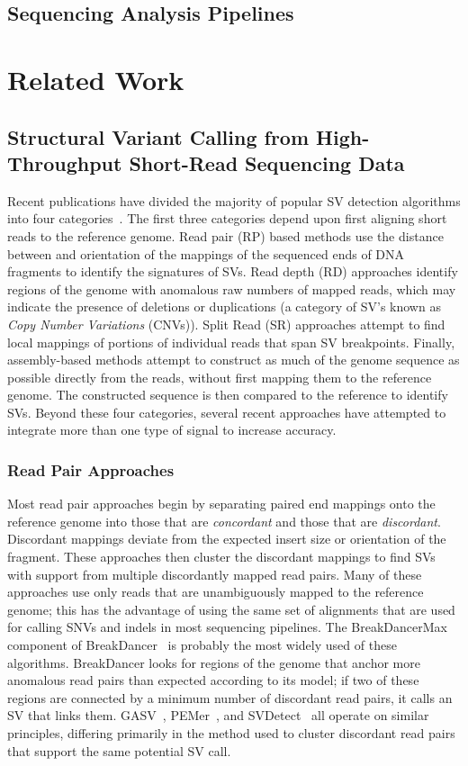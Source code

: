 \documentclass [11pt] {report}
\begin{document}
\section{Sequencing Analysis Pipelines}

% 
\chapter{Related Work}

\section{Structural Variant Calling from High-Throughput Short-Read Sequencing Data}

Recent publications have divided the majority of popular SV detection algorithms into four categories~\cite{Alkan:2011p547}. The first three categories depend upon first aligning short reads to the reference genome. Read pair (RP) based methods use the distance between and orientation of the mappings of the sequenced ends of DNA fragments to identify the signatures of SVs. Read depth (RD) approaches identify regions of the genome with anomalous raw numbers of mapped reads, which may indicate the presence of deletions or duplications (a category of SV's known as \emph{Copy Number Variations} (CNVs)). Split Read (SR) approaches attempt to find local mappings of portions of individual reads that span SV breakpoints. Finally, assembly-based methods attempt to construct as much of the genome sequence as possible directly from the reads, without first mapping them to the reference genome. The constructed sequence is then compared to the reference to identify SVs. Beyond these four categories, several recent approaches have attempted to integrate more than one type of signal to increase accuracy.

\subsection{Read Pair Approaches}

Most read pair approaches begin by separating paired end mappings onto the reference genome into those that are \emph{concordant} and those that are \emph{discordant}. Discordant mappings deviate from the expected insert size or orientation of the fragment. These approaches then cluster the discordant mappings to find SVs with support from multiple discordantly mapped read pairs. Many of these approaches use only reads that are unambiguously mapped to the reference genome; this has the advantage of using the same set of alignments that are used for calling SNVs and indels in most sequencing pipelines. The BreakDancerMax component of BreakDancer~\cite{Chen:2009p3} is probably the most widely used of these algorithms. BreakDancer looks for regions of the genome that anchor more anomalous read pairs than expected according to its model; if two of these regions are connected by a minimum number of discordant read pairs, it calls an SV that links them. GASV~\cite{Sindi:2009gu}, PEMer~\cite{Korbel:2009dy}, and SVDetect~\cite{Zeitouni:2010p8} all operate on similar principles, differing primarily in the method used to cluster discordant read pairs that support the same potential SV call.
\end{document}
